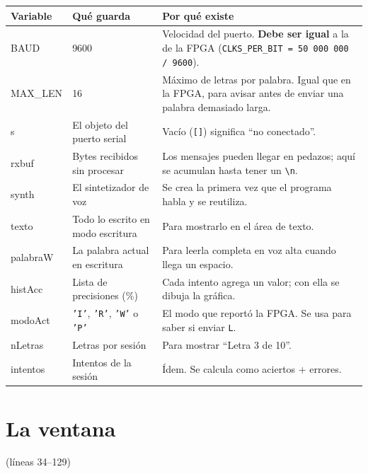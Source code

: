 \documentclass[11pt,a4paper]{article}
\newcommand{\linea}[1]{\textcolor{gris}{\small(líneas #1)}}
\newcommand{\cod}[1]{\texttt{#1}}
\begin{document}
\begin{longtable}{>{\ttfamily}p{2.3cm} p{4.6cm} p{7.2cm}}
\toprule
\normalfont\textbf{Variable} & \textbf{Qué guarda} & \textbf{Por qué existe} \\
\midrule
\endhead
BAUD & 9600 & Velocidad del puerto. \textbf{Debe ser igual} a la de la FPGA (\cod{CLKS\_PER\_BIT = 50\,000\,000 / 9600}). \\
MAX\_LEN & 16 & Máximo de letras por palabra. Igual que en la FPGA, para avisar antes de enviar una palabra demasiado larga. \\
s & El objeto del puerto serial & Vacío (\cod{[]}) significa ``no conectado''. \\
rxbuf & Bytes recibidos sin procesar & Los mensajes pueden llegar en pedazos; aquí se acumulan hasta tener un \cod{\textbackslash n}. \\
synth & El sintetizador de voz & Se crea la primera vez que el programa habla y se reutiliza. \\
texto & Todo lo escrito en modo escritura & Para mostrarlo en el área de texto. \\
palabraW & La palabra actual en escritura & Para leerla completa en voz alta cuando llega un espacio. \\
histAcc & Lista de precisiones (\%) & Cada intento agrega un valor; con ella se dibuja la gráfica. \\
modoAct & \cod{'I'}, \cod{'R'}, \cod{'W'} o \cod{'P'} & El modo que reportó la FPGA. Se usa para saber si enviar \cod{L}. \\
nLetras & Letras por sesión & Para mostrar ``Letra 3 de 10''. \\
intentos & Intentos de la sesión & Ídem. Se calcula como aciertos + errores. \\
\bottomrule
\end{longtable}

\section{La ventana}
\linea{34--129}
\end{document}
